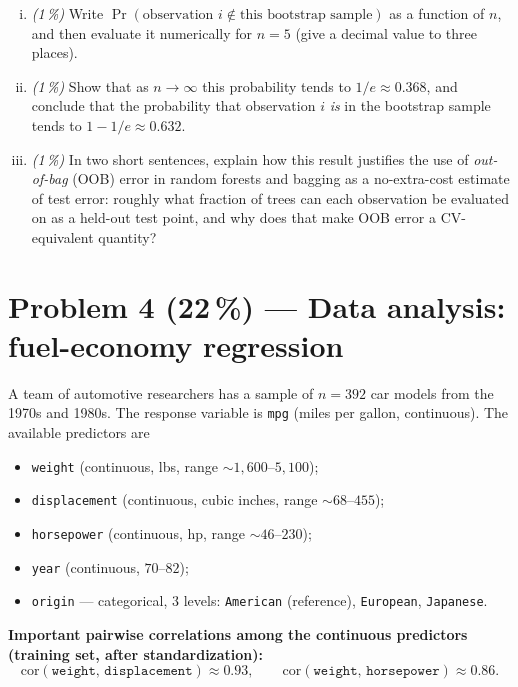 \documentclass[11pt,a4paper]{article}
\newcommand{\points}[1]{\textbf{(#1\,\%)}}
\newcommand{\subpoints}[1]{\textit{(#1\,\%)}}
\begin{document}
\begin{enumerate}[(i)]
  \item \subpoints{1} Write $\Pr(\text{observation } i \notin \text{this bootstrap sample})$ as a function of $n$, and then evaluate it numerically for $n = 5$ (give a decimal value to three places).

  \item \subpoints{1} Show that as $n \to \infty$ this probability tends to $1/e \approx 0.368$, and conclude that the probability that observation $i$ \emph{is} in the bootstrap sample tends to $1 - 1/e \approx 0.632$.

  \item \subpoints{1} In two short sentences, explain how this result justifies the use of \emph{out-of-bag} (OOB) error in random forests and bagging as a no-extra-cost estimate of test error: roughly what fraction of trees can each observation be evaluated on as a held-out test point, and why does that make OOB error a CV-equivalent quantity?
\end{enumerate}

\vfill\eject

\section*{Problem 4 \points{22} --- Data analysis: fuel-economy regression}

A team of automotive researchers has a sample of $n = 392$ car models from the 1970s and 1980s. The response variable is \texttt{mpg} (miles per gallon, continuous). The available predictors are
\begin{itemize}
  \item \texttt{weight} (continuous, lbs, range $\sim 1{,}600$--$5{,}100$);
  \item \texttt{displacement} (continuous, cubic inches, range $\sim 68$--$455$);
  \item \texttt{horsepower} (continuous, hp, range $\sim 46$--$230$);
  \item \texttt{year} (continuous, $70$--$82$);
  \item \texttt{origin} --- categorical, $3$ levels: \texttt{American} (reference), \texttt{European}, \texttt{Japanese}.
\end{itemize}

\textbf{Important pairwise correlations among the continuous predictors (training set, after standardization):}
$$\mathrm{cor}(\texttt{weight},\, \texttt{displacement}) \approx 0.93, \qquad \mathrm{cor}(\texttt{weight},\, \texttt{horsepower}) \approx 0.86.$$
\end{document}
